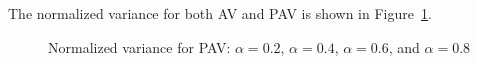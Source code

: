 \documentclass[10pt]{article}
\begin{document}
The normalized variance for both \ac{AV} and \ac{PAV} is shown in Figure~\ref{fig:pav}.
\begin{figure}[ht!]
\centering
{}
\label{fig:subfigureExample}
\caption[Normalized variance for \acs{PAV}]{Normalized variance for \acf{PAV}:  $\alpha = 0.2$,  $\alpha = 0.4$,  $\alpha = 0.6$, and  $\alpha = 0.8$}\label{fig:pav}
\end{figure}
\end{document}

